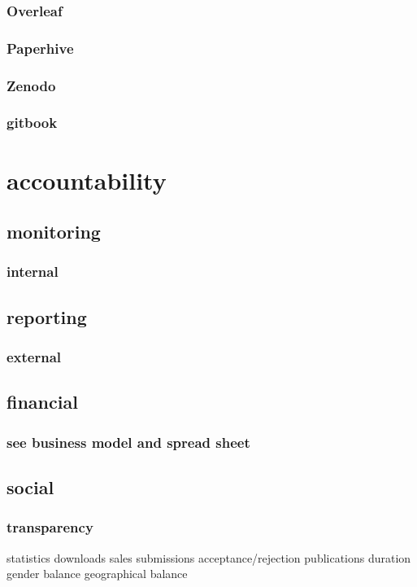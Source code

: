 \documentclass[output=guidelines,guidelines] {langscibook}
\begin{document}
\subsubsection{Overleaf}
\subsubsection{Paperhive}
\subsubsection{Zenodo}
\subsubsection{gitbook}
\section{accountability}
\subsection{monitoring}
\subsubsection{internal}
\subsection{reporting}
\subsubsection{external}
\subsection{financial}
\subsubsection{see business model and spread sheet}
\subsection{social}
\subsubsection{transparency}
                    statistics
                        downloads
                        sales
                        submissions
                        acceptance/rejection
                        publications
                        duration
                        gender balance
                        geographical balance
\end{document}
